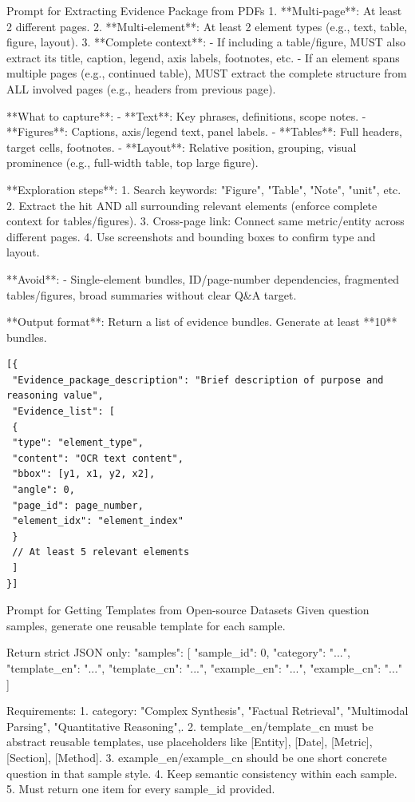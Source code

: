 \documentclass{llmxive}
\begin{document}
{{{\begin{promptbox}[breakable]{Prompt for Extracting Evidence Package from PDFs}
1. **Multi-page**: At least 2 different pages.
2. **Multi-element**: At least 2 element types (e.g., text, table, figure, layout).
3. **Complete context**:
 - If including a table/figure, MUST also extract its title, caption, legend, axis labels, footnotes, etc.
 - If an element spans multiple pages (e.g., continued table), MUST extract the complete structure from ALL involved pages (e.g., headers from previous page).

**What to capture**:
- **Text**: Key phrases, definitions, scope notes.
- **Figures**: Captions, axis/legend text, panel labels.
- **Tables**: Full headers, target cells, footnotes.
- **Layout**: Relative position, grouping, visual prominence (e.g., full-width table, top large figure).

**Exploration steps**:
1. Search keywords: "Figure", "Table", "Note", "unit", etc.
2. Extract the hit AND all surrounding relevant elements (enforce complete context for tables/figures).
3. Cross-page link: Connect same metric/entity across different pages.
4. Use screenshots and bounding boxes to confirm type and layout.

**Avoid**:
- Single-element bundles, ID/page-number dependencies, fragmented tables/figures, broad summaries without clear Q&A target.

**Output format**: Return a list of evidence bundles. Generate at least **10** bundles.

\begin{lstlisting}
[{
 "Evidence_package_description": "Brief description of purpose and reasoning value",
 "Evidence_list": [
 {
 "type": "element_type",
 "content": "OCR text content",
 "bbox": [y1, x1, y2, x2],
 "angle": 0,
 "page_id": page_number,
 "element_idx": "element_index"
 }
 // At least 5 relevant elements
 ]
}]
\end{lstlisting}
\end{promptbox}

\begin{promptbox}[breakable]{Prompt for Getting Templates from Open-source Datasets}
Given question samples, generate one reusable template for each sample.

Return strict JSON only:
{{
 "samples": [
 {{
 "sample_id": 0,
 "category": "...",
 "template_en": "...",
 "template_cn": "...",
 "example_en": "...",
 "example_cn": "..."
 }}
 ]
}}

Requirements:
1. category: "Complex Synthesis", "Factual Retrieval", "Multimodal Parsing", "Quantitative Reasoning",.
2. template_en/template_cn must be abstract reusable templates, use placeholders like [Entity], [Date], [Metric], [Section], [Method].
3. example_en/example_cn should be one short concrete question in that sample style.
4. Keep semantic consistency within each sample.
5. Must return one item for every sample_id provided.
\end{promptbox}

}}}
\end{document}

